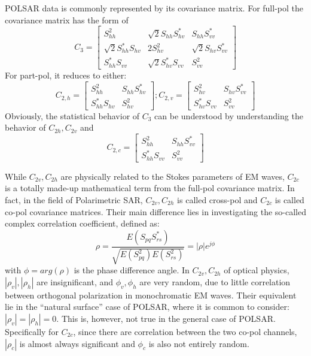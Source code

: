 \documentclass[journal]{IEEEtran}
\begin{document}
POLSAR data is commonly represented by its covariance matrix.
For full-pol the covariance matrix has the form of
\begin{equation*}
C_3 = 
\begin{bmatrix}
S_{hh}^2 & \sqrt{2}S_{hh}S_{hv}^* & S_{hh}S_{vv}^* \\ 
\sqrt{2}S_{hh}^*S_{hv} &2S_{hv}^2  & \sqrt{2}S_{hv}S_{vv}^*\\ 
S_{hh}^*S_{vv} & \sqrt{2}S_{hv}^*S_{vv} & S_{vv}^2
\end{bmatrix}
\end{equation*}
For part-pol, it reduces to either:
\begin{equation*}
  C_{2,h} =
  \begin{bmatrix}
    S_{hh}^2 & S_{hh}S_{hv}^* \\
    S_{hh}^*S_{hv} & S_{hv}^2
  \end{bmatrix};
  C_{2,v} =
  \begin{bmatrix}
    S_{hv}^2 & S_{hv}S_{vv}^* \\
    S_{hv}^*S_{vv} & S_{vv}^2
  \end{bmatrix}
\end{equation*}
Obviously, the statistical behavior of $C_3$ can be understood by understanding the behavior of $C_{2h},C_{2v}$ and
\begin{equation*}
  C_{2,c} = 
\begin{bmatrix}
    S_{hh}^2 & S_{hh}S_{vv}^* \\
    S_{hh}^*S_{vv} & S_{vv}^2
\end{bmatrix}
\end{equation*}

While $C_{2v}, C_{2h}$ are physically related to the Stokes parameters of EM waves,
  $C_{2c}$ is a totally made-up mathematical term from the full-pol covariance matrix.
In fact, in the field of Polarimetric SAR, $C_{2v}, C_{2h}$ is called cross-pol and $C_{2c}$ is called co-pol covariance matrices.
Their main difference lies in investigating the so-called complex correlation coefficient, defined as:
\begin{equation*}
  \rho = \frac{E \left( S_{pq}S_{rs}^* \right) }{\sqrt{E \left( S^2_{pq} \right) E \left( S^2_{rs} \right) }} = |\rho| e^{j \phi}
\end{equation*}
with $\phi=arg(\rho)$ is the phase difference angle.
In $C_{2v}, C_{2h}$ of optical physics, $|\rho_v|,|\rho_h|$ are insignificant,
  and $\phi_v,\phi_h$ are very random, due to little correlation between orthogonal polarization in monochromatic EM waves.
Their equivalent lie in the ``natural surface'' case of POLSAR,
  where  it is common to consider: $|\rho_v|=|\rho_h|=0$.
This is, however, not true in the general case of POLSAR.  
Specifically for $C_{2c}$, since there are correlation between the two co-pol channels,
  $|\rho_c|$ is almost always significant and $\phi_c$ is also not entirely random.
\end{document}
